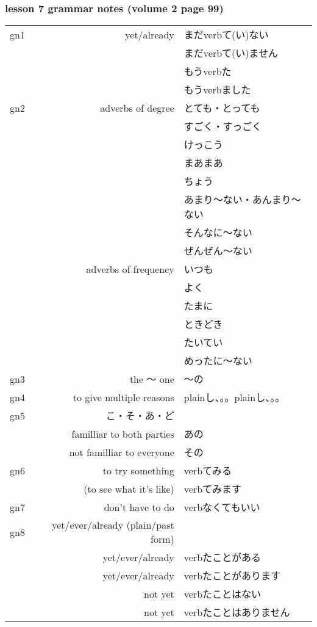 \documentclass[extrafontsizes,14pt]{memoir}
\begin{document}
\begin{CJK}{UTF8}{min}

\subsubsection{lesson 7 grammar notes (volume 2 page 99)}
\begin{tabular}{lrl}

gn1&yet/already&
  まだverbて(い)ない\\
&&まだverbて(い)ません\\
&&もうverbた\\
&&もうverbました\\
\hline

gn2&adverbs of degree&
  とても・とっても\\
&&すごく・すっごく\\
&&けっこう\\
&&まあまあ\\
&&ちょう\\
&&あまり〜ない・あんまり〜ない\\
&&そんなに〜ない\\
&&ぜんぜん〜ない\\
&adverbs of frequency&
  いつも\\
&&よく\\
&&たまに\\
&&ときどき\\
&&たいてい\\
&&めったに〜ない\\
\hline

gn3&the 〜 one&〜の\\
\hline

gn4&to give multiple reasons&plainし、。。plainし、。。\\
\hline

gn5&こ・そ・あ・ど&\\
&familliar to both parties&あの\\
&not familliar to everyone&その\\
\hline

gn6&to try something&
  verbてみる\\
&(to see what it's like)&
  verbてみます\\
\hline

gn7&don't have to do&verbなくてもいい\\
\hline

gn8&yet/ever/already (plain/past form)&\\
&yet/ever/already&verbたことがある\\
&yet/ever/already&verbたことがあります\\
&not yet&verbたことはない\\
&not yet&verbたことはありません\\
\hline


\end{tabular}
\end{CJK}
\end{document}
